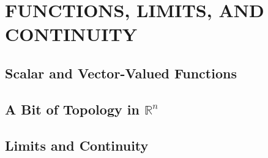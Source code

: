 \section{FUNCTIONS, LIMITS, AND CONTINUITY}

\subsection{Scalar and Vector-Valued Functions}

\subsection{A Bit of Topology in \( \mathbb{R}^n \)}

\subsection{Limits and Continuity}
